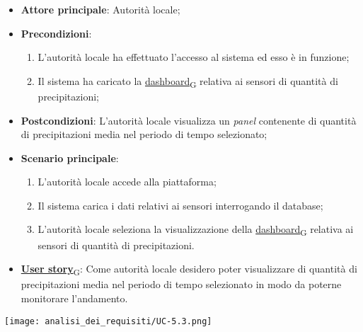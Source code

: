 \begin{itemize}
	\item \textbf{Attore principale}: Autorità locale;
	\item \textbf{Precondizioni}:
	      \begin{enumerate}
		      \item L'autorità locale ha effettuato l'accesso al sistema ed esso è in funzione;
		      \item Il sistema ha caricato la \href{https://7last.github.io/docs/rtb/documentazione-interna/glossario\#dashboard}{dashboard\textsubscript{G}} relativa ai sensori di quantità di precipitazioni;
	      \end{enumerate}
	\item \textbf{Postcondizioni}: L'autorità locale visualizza un \textit{panel} contenente di quantità di precipitazioni media nel periodo di tempo selezionato;
	\item \textbf{Scenario principale}:
	      \begin{enumerate}
		      \item L'autorità locale accede alla piattaforma;
		      \item Il sistema carica i dati relativi ai sensori interrogando il database;
		      \item L'autorità locale seleziona la visualizzazione della \href{https://7last.github.io/docs/rtb/documentazione-interna/glossario\#dashboard}{dashboard\textsubscript{G}} relativa ai sensori di quantità di precipitazioni.
	      \end{enumerate}
	\item \href{https://7last.github.io/docs/rtb/documentazione-interna/glossario\#user-story}{\textbf{User story}\textsubscript{G}}: Come autorità locale desidero poter visualizzare di quantità di precipitazioni media nel periodo di tempo selezionato
	      in modo da poterne monitorare l'andamento.
\end{itemize}
\begin{center}
	\texttt{[image: analisi\_dei\_requisiti/UC-5.3.png]}
\end{center}

